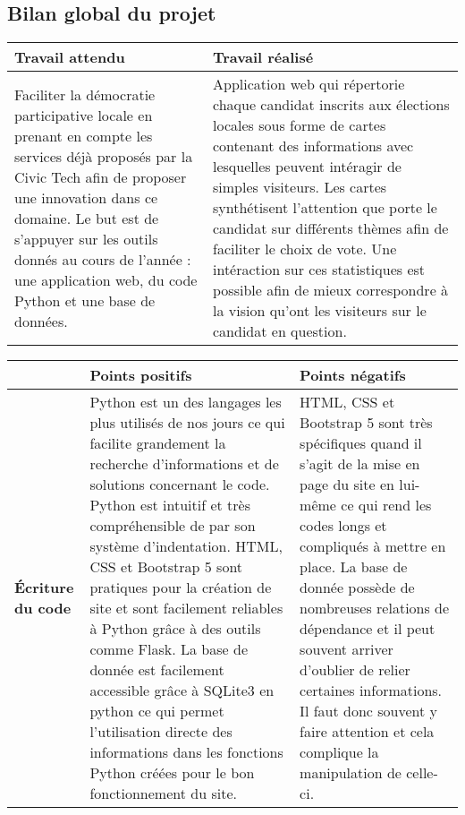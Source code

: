 \vskip 0.60cm
\subsection{Bilan global du projet}
\vskip 0.25cm
\noindent
\begin{tabularx}{\textwidth}{|X|X|}
    \hline 
    Travail attendu & Travail réalisé \\
    \hline
    Faciliter la démocratie participative locale en prenant en compte les services déjà proposés par la Civic Tech afin de proposer une innovation dans ce domaine. Le but est de s'appuyer sur les outils donnés au cours de l'année : une application web, du code Python et une base de données.
    & 
    Application web qui répertorie chaque candidat inscrits aux élections locales sous forme de cartes contenant des informations avec lesquelles peuvent intéragir de simples visiteurs. Les cartes synthétisent l'attention que porte le candidat sur différents thèmes afin de faciliter le choix de vote. Une intéraction sur ces statistiques est possible afin de mieux correspondre à la vision qu'ont les visiteurs sur le candidat en question.
    \\
    \hline
\end{tabularx}
\vskip 0.60cm
\noindent
\begin{tabularx}{\textwidth}{|X|X|X|}
    \hline
     & Points positifs & Points négatifs \\
    \hline
    \textbf{Écriture du code} & 
    Python est un des langages les plus utilisés de nos jours ce qui facilite grandement la recherche d'informations et de solutions concernant le code. Python est intuitif et très compréhensible de par son système d'indentation.
    \vskip 0.25cm
    HTML, CSS et Bootstrap 5 sont pratiques pour la création de site et sont facilement reliables à Python grâce à des outils comme Flask.
    \vskip 0.25cm
    La base de donnée est facilement accessible grâce à SQLite3 en python ce qui permet l'utilisation directe des informations dans les fonctions Python créées pour le bon fonctionnement du site.
    &
    HTML, CSS et Bootstrap 5 sont très spécifiques quand il s'agit de la mise en page du site en lui-même ce qui rend les codes longs et compliqués à mettre en place.
    \vskip 0.25cm
    La base de donnée possède de nombreuses relations de dépendance et il peut souvent arriver d'oublier de relier certaines informations. Il faut donc souvent y faire attention et cela complique la manipulation de celle-ci.
    \\
    \hline
\end{tabularx}
\vskip 0.60cm
